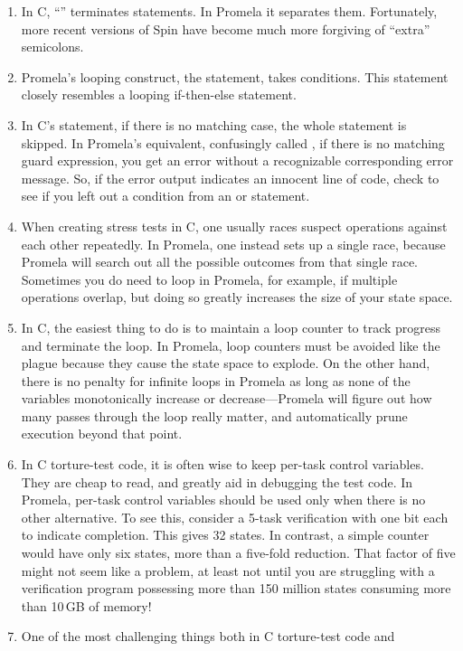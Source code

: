 \begin{enumerate}
\item	In C, ``\co{;}'' terminates statements.
	In Promela it separates them.
	Fortunately, more recent versions of Spin have become
	much more forgiving of ``extra'' semicolons.
\item	Promela's looping construct, the  statement, takes
	conditions.
	This  statement closely resembles a looping if-then-else
	statement.
\item	In C's  statement, if there is no matching case, the whole
	statement is skipped.
	In Promela's equivalent, confusingly called , if there is
	no matching guard expression, you get an error without a
	recognizable corresponding error message.
	So, if the error output indicates an innocent line of code,
	check to see if you left out a condition from an  or 
	statement.
\item	When creating stress tests in C, one usually races suspect operations
	against each other repeatedly.
	In Promela, one instead sets up a single race, because Promela
	will search out all the possible outcomes from that single race.
	Sometimes you do need to loop in Promela, for example,
	if multiple operations overlap, but
	doing so greatly increases the size of your state space.
\item	In C, the easiest thing to do is to maintain a loop counter to track
	progress and terminate the loop.
	In Promela, loop counters must be avoided like the plague
	because they cause the state space to explode.
	On the other hand, there is no penalty for infinite loops in
	Promela as long as none of the variables monotonically increase
	or decrease---Promela will figure out how many passes through
	the loop really matter, and automatically prune execution beyond
	that point.
\item	In C torture-test code, it is often wise to keep per-task control
	variables.
	They are cheap to read, and greatly aid in debugging the test code.
	In Promela, per-task control variables should be used only when
	there is no other alternative.
	To see this, consider a 5-task verification with one bit each
	to indicate completion.
	This gives 32 states.
	In contrast, a simple counter would have only six states,
	more than a five-fold reduction.
	That factor of five might not seem like a problem, at least
	not until you are struggling with a verification program
	possessing more than 150 million states consuming more
	than 10\,GB of memory!
\item	One of the most challenging things both in C torture-test code and

\end{enumerate}
